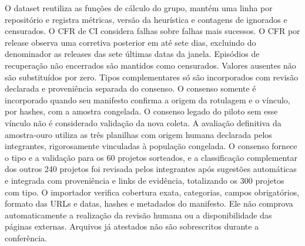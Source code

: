 O dataset reutiliza as funções de cálculo do grupo, mantém uma linha por
repositório e registra métricas, versão da heurística e contagens de ignorados
e censurados. O CFR de CI considera falhas sobre falhas mais sucessos. O CFR por
release observa uma corretiva posterior em até sete dias, excluindo do denominador
as releases das sete últimas datas da janela. Episódios de recuperação não
encerrados são mantidos como censurados. Valores ausentes não são substituídos
por zero. Tipos complementares só são incorporados com revisão declarada e
proveniência separada do consenso.
O consenso somente é incorporado quando seu manifesto confirma a origem da
rotulagem e o vínculo, por hashes, com a amostra congelada. O consenso legado
do piloto sem esse vínculo não é considerado validação da nova coleta. A avaliação
definitiva da amostra-ouro utiliza as três planilhas com origem humana declarada
pelos integrantes, rigorosamente vinculadas à população congelada. O consenso
fornece o tipo e a validação para os 60 projetos sorteados, e a classificação
complementar dos outros 240 projetos foi revisada pelos integrantes após sugestões
automáticas e integrada com proveniência e links de evidência, totalizando os 300
projetos com tipo. O importador verifica cobertura exata, categorias, campos
obrigatórios, formato das URLs e datas, hashes e metadados do manifesto. Ele não
comprova automaticamente a realização da revisão humana ou a disponibilidade das
páginas externas. Arquivos já atestados não são sobrescritos durante a conferência.

